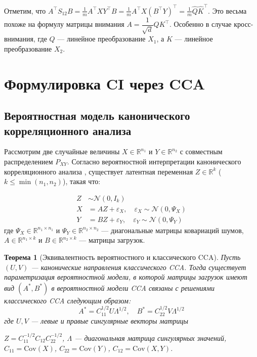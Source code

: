 \documentclass[a4paper,14pt]{article}
\renewcommand{\leq}{\ensuremath{\leqslant}}
\theoremstyle{plain} %
\newtheorem{theorem}{Теорема}[section]
\theoremstyle{definition} %
\theoremstyle{remark} %
\begin{document}
Отметим, что $A^\top S_{12} B = \frac{1}{m} A^\top X Y^\top B = \frac{1}{m} A^\top X \left( B^\top Y \right)^\top = \frac{1}{m} \widehat{Q} \widehat{K}^\top$. Это весьма похоже на формулу матрицы внимания $A = \dfrac{1}{\sqrt{d}} Q K^\top$. Особенно в случае кросс-внимания, где $Q$ — линейное преобразование $X_1$, а $K$ — линейное преобразование $X_2$.


        \section{Формулировка CI через CCA}

\subsection{Вероятностная модель канонического корреляционного анализа}

Рассмотрим две случайные величины $X \in \mathbb{R}^{n_1}$ и $Y \in \mathbb{R}^{n_2}$ с совместным распределением $P_{XY}$. Согласно вероятностной интерпретации канонического корреляционного анализа \cite{Bach2005API}, существует латентная переменная $Z \in \mathbb{R}^k$ ($k \leq \min(n_1, n_2)$), такая что:

\begin{equation}
\begin{aligned}
Z &\sim \mathcal{N}(0, I_k) \\
X &= A Z + \varepsilon_X, \quad \varepsilon_X \sim \mathcal{N}(0, \Psi_X) \\
Y &= B Z + \varepsilon_Y, \quad \varepsilon_Y \sim \mathcal{N}(0, \Psi_Y)
\end{aligned}
\end{equation}
где $\Psi_X \in \mathbb{R}^{n_1 \times n_1}$ и $\Psi_Y \in \mathbb{R}^{n_2 \times n_2}$ --- диагональные матрицы ковариаций шумов, $A \in \mathbb{R}^{n_1 \times k}$ и $B \in \mathbb{R}^{n_2 \times k}$ --- матрицы загрузок.

\begin{theorem}[Эквивалентность вероятностного и классического CCA]
Пусть $(U,V)$ — канонические направления классического CCA.
Тогда существует параметризация вероятностной модели,
в которой матрицы загрузок имеют вид $(A^*, B^*)$ в вероятностной модели CCA связаны с решениями классического CCA следующим образом:
\begin{equation}
A^* = C_{11}^{1/2} U \Lambda^{1/2}, \quad B^* = C_{22}^{1/2} V \Lambda^{1/2}
\end{equation}
где $U, V$ --- левые и правые сингулярные векторы матрицы 

$Z = C_{11}^{-1/2}C_{12}C_{22}^{-1/2}$, $\Lambda$ --- диагональная матрица сингулярных значений, $C_{11} = \text{Cov}(X)$, $C_{22} = \text{Cov}(Y)$, $C_{12} = \text{Cov}(X,Y)$.
\end{theorem}
\end{document}
